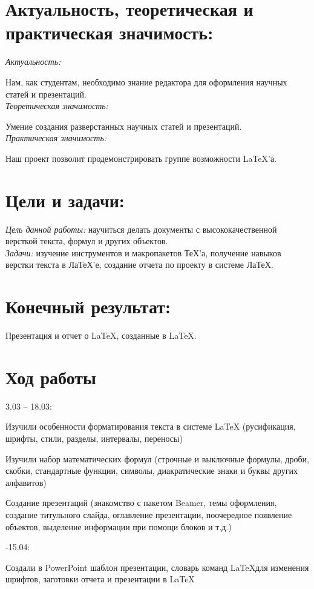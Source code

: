 \documentclass{article}
\begin{document}
	\section*{Актуальность, теоретическая и практическая значимость:}
	
	
	\noindent\emph{Актуальность:}
	
	
	\noindent Нам, как студентам, необходимо знание редактора для оформления научных статей и презентаций.\\
	
	
	\noindent\emph{Теоретическая значимость:}
	
	
	\noindent Умение создания разверстанных научных статей и презентаций.\\
	
	
	\noindent\emph{Практическая значимость:}
	
	
	\noindent Наш проект позволит продемонстрировать группе возможности LaTeX’а.
	
	
	\section*{Цели и задачи:}
	
	
	\emph{Цель данной работы:} научиться делать документы с высококачественной версткой текста, формул и других объектов.\\
	
	
	\noindent\emph{Задачи:} изучение инструментов и макропакетов ТеХ'а, получение навыков верстки текста в ЛаТеХ'е, создание отчета по проекту в системе ЛаТеХ.
	
	
	\section*{Конечный результат:}
	Презентация и отчет о \LaTeX, созданные в \LaTeX.
	
	\section*{Ход работы}
	3.03 – 18.03:
	
	Изучили особенности форматирования текста в системе LaTeX (русификация, шрифты, стили, разделы, интервалы, переносы)
	
	Изучили набор математических формул (строчные и выключные формулы, дроби, скобки, стандартные функции, символы, диакратические знаки и буквы других алфавитов)
	
	Создание презентаций (знакомство с пакетом Beamer, темы оформления, создание титульного слайда, оглавление презентации, поочередное появление объектов, выделение информации при помощи блоков и т.д.)
	\vspace{\baselineskip}
	\vspace{\baselineskip}
	
	
	
	-15.04:
	
	Создали в PowerPoint шаблон презентации, словарь команд \LaTeX для изменения шрифтов, заготовки отчета и презентации в \LaTeX
	
\end{document}
